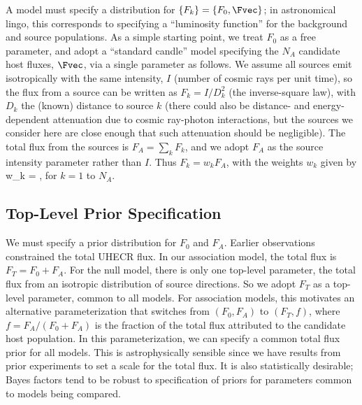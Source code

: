 
A model must specify a distribution for $\{F_k\} = \{F_0, \Fvec\}$; in
astronomical lingo, this corresponds to specifying a ``luminosity function''
for the background and source populations.  As a simple starting point, we
treat $F_0$ as a free parameter, and adopt
a ``standard candle'' model specifying the $N_A$ candidate host fluxes, $\Fvec$,
via a single parameter as follows.  We assume all sources emit isotropically
with the same intensity, $I$ (number of cosmic rays per unit time), so the
flux from a source can be written as $F_k = I/D_k^2$ (the inverse-square
law), with $D_k$ the (known) distance to source $k$ (there could also be
distance- and energy-dependent attenuation due to cosmic ray-photon
interactions, but the sources we consider here are close enough that such
attenuation should be negligible).  The total flux from the sources is $F_A
= \sum_k F_k$, and we adopt $F_A$ as the source intensity parameter rather
than $I$.  Thus $F_k = w_k F_A$, with the weights $w_k$ given by
\be
w_k = ,
\label{wt-def}
\ee
for $k=1$ to $N_A$.

\subsection{Top-Level Prior Specification}

We must specify a prior distribution for $F_0$ and $F_A$.
Earlier observations constrained the total UHECR flux.  In our association
model, the total flux is $F_T = F_0 + F_A$.  For the null model, there is
only one top-level parameter, the total flux from an isotropic distribution
of source directions.  So we adopt $F_T$ as a top-level parameter,
common to all models.  For association models, this motivates an alternative
parameterization that switches from $(F_0, F_A)$ to $(F_T, f)$, where $f =
F_A/(F_0 + F_A)$ is the fraction of the total flux attributed to the
candidate host population.
In this parameterization, we can specify a common total flux prior
for all models.  This is astrophysically sensible since we have
results from prior experiments to set a scale for the total flux.
It is also statistically desirable; Bayes factors tend to be robust
to specification of priors for parameters common to models being compared.

